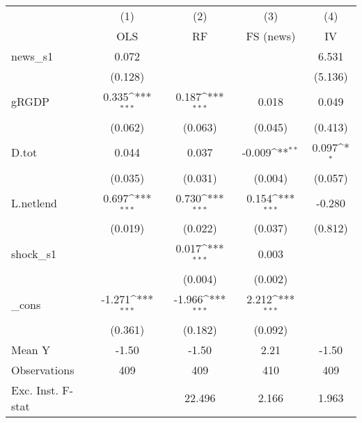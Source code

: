 {
\def\sym#1{\ifmmode^{#1}\else\(^{#1}\)\fi}
\begin{tabular}{l*{4}{c}}
\toprule
            &\multicolumn{1}{c}{(1)}&\multicolumn{1}{c}{(2)}&\multicolumn{1}{c}{(3)}&\multicolumn{1}{c}{(4)}\\
            &\multicolumn{1}{c}{OLS}&\multicolumn{1}{c}{RF}&\multicolumn{1}{c}{FS (news)}&\multicolumn{1}{c}{IV}\\
\midrule
news\_s1     &       0.072         &                     &                     &       6.531         \\
            &     (0.128)         &                     &                     &     (5.136)         \\
\addlinespace
gRGDP       &       0.335\sym{***}&       0.187\sym{***}&       0.018         &       0.049         \\
            &     (0.062)         &     (0.063)         &     (0.045)         &     (0.413)         \\
\addlinespace
D.tot       &       0.044         &       0.037         &      -0.009\sym{**} &       0.097\sym{*}  \\
            &     (0.035)         &     (0.031)         &     (0.004)         &     (0.057)         \\
\addlinespace
L.netlend   &       0.697\sym{***}&       0.730\sym{***}&       0.154\sym{***}&      -0.280         \\
            &     (0.019)         &     (0.022)         &     (0.037)         &     (0.812)         \\
\addlinespace
shock\_s1    &                     &       0.017\sym{***}&       0.003         &                     \\
            &                     &     (0.004)         &     (0.002)         &                     \\
\addlinespace
\_cons      &      -1.271\sym{***}&      -1.966\sym{***}&       2.212\sym{***}&                     \\
            &     (0.361)         &     (0.182)         &     (0.092)         &                     \\
\midrule
Mean Y      &       -1.50         &       -1.50         &        2.21         &       -1.50         \\
Observations&         409         &         409         &         410         &         409         \\
Exc. Inst. F-stat&                     &      22.496         &       2.166         &       1.963         \\
\bottomrule
\end{tabular}
}
